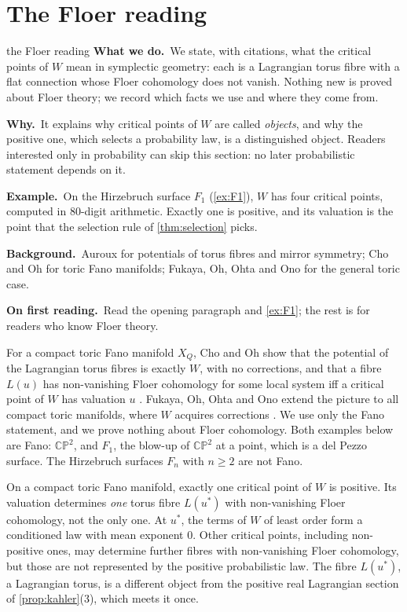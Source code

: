 \documentclass[11pt]{article}
\theoremstyle{definition}\newtheorem{definition}[theorem]{Definition}\newtheorem{remark}[theorem]{Remark}\newtheorem{example}[theorem]{Example}\newtheorem{problem}[theorem]{Open problem}\crefname{problem}{Problem}{Problems}
\newcommand{\rbwhat}{\textcolor{rbWhat}{\textbf{What we do.}}~}\newcommand{\rbwhy}{\par\smallskip\textcolor{rbWhy}{\textbf{Why.}}~}
\newcommand{\rbex}{\par\smallskip\textcolor{rbEx}{\textbf{Example.}}~}\newcommand{\rbbg}{\par\smallskip\textcolor{rbBg}{\textbf{Background.}}~}
\newcommand{\rbfirst}{\par\smallskip\textcolor{rbFirst}{\textbf{On first reading.}}~}
\begin{document}
\section{The Floer reading}\label{sec:floer}
\begin{readerbox}{the Floer reading}
\rbwhat We state, with citations, what the critical points of $W$ mean in symplectic geometry: each is a Lagrangian torus fibre with a flat connection whose Floer cohomology does not vanish. Nothing new is proved about Floer theory; we record which facts we use and where they come from.
\rbwhy It explains why critical points of $W$ are called \emph{objects}, and why the positive one, which selects a probability law, is a distinguished object. Readers interested only in probability can skip this section: no later probabilistic statement depends on it.
\rbex On the Hirzebruch surface $F_1$ (\cref{ex:F1}), $W$ has four critical points, computed in $80$-digit arithmetic. Exactly one is positive, and its valuation is the point that the selection rule of \cref{thm:selection} picks.
\rbbg Auroux \cite{Auroux2007} for potentials of torus fibres and mirror symmetry; Cho and Oh \cite{ChoOh2006} for toric Fano manifolds; Fukaya, Oh, Ohta and Ono \cite{FOOO2010} for the general toric case.
\rbfirst Read the opening paragraph and \cref{ex:F1}; the rest is for readers who know Floer theory.
\end{readerbox}
For a compact toric Fano manifold $X_Q$, Cho and Oh show that the potential of the Lagrangian torus fibres is exactly $W$, with no
corrections, and that a fibre $L(u)$ has non-vanishing Floer cohomology for some local system iff a critical point of $W$ has valuation $u$
\cite{ChoOh2006}. Fukaya, Oh, Ohta and Ono extend the picture to all compact toric manifolds, where $W$ acquires corrections \cite{FOOO2010}.
We use only the Fano statement, and we prove nothing about Floer cohomology. Both examples below are Fano: $\mathbb{CP}^2$, and $F_1$, the blow-up of
$\mathbb{CP}^2$ at a point, which is a del Pezzo surface. The Hirzebruch surfaces $F_n$ with $n\ge2$ are not Fano.

\begin{corollary}\label{cor:fibre}
On a compact toric Fano manifold, exactly one critical point of $W$ is positive. Its valuation determines \emph{one} torus fibre $L(u^*)$ with
non-vanishing Floer cohomology, not the only one. At $u^*$, the terms of $W$ of least order form a conditioned law with mean exponent $0$.
Other critical points, including non-positive ones, may determine further fibres with non-vanishing Floer cohomology, but those are not
represented by the positive probabilistic law. The fibre $L(u^*)$, a Lagrangian torus, is a different object from the positive real
Lagrangian section of \cref{prop:kahler}(3), which meets it once.
\end{corollary}
\end{document}
